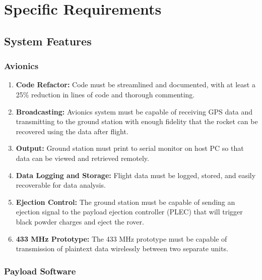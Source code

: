 \documentclass[onecolumn, draftclsnofoot, 10pt, compsoc]{IEEEtran}
\begin{document}
\section{Specific Requirements}
\subsection{System Features}
\subsubsection{Avionics} \begin{enumerate}
\item \textbf{Code Refactor:} Code must be streamlined and documented, with at least a 25\% reduction in lines of code and thorough commenting. 
\item \textbf{Broadcasting:} Avionics system must be capable of receiving GPS data and transmitting to the ground station with enough fidelity that the rocket can be recovered using the data after flight.
\item \textbf{Output:} Ground station must print to serial monitor on host PC so that data can be viewed and retrieved remotely.
\item \textbf{Data Logging and Storage:} Flight data must be logged, stored, and easily recoverable for data analysis.
\item \textbf{Ejection Control:} The ground station must be capable of sending an ejection signal to the payload ejection controller (PLEC) that will trigger black powder charges and eject the rover.
\item \textbf{433 MHz Prototype:} The 433 MHz prototype must be capable of transmission of plaintext data wirelessly between two separate units.
\end{enumerate}
\subsubsection{Payload Software}
\end{document}
